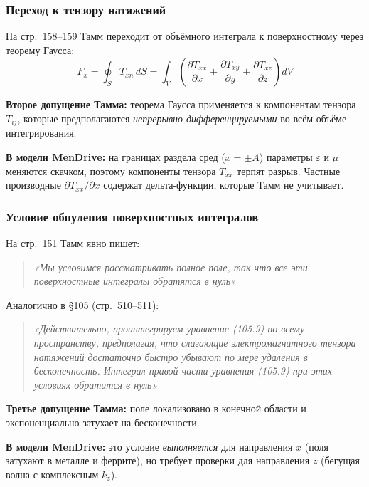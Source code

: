 \documentclass[a4paper,12pt]{article}
\begin{document}
\subsubsection{Переход к тензору натяжений}

На стр.~158--159 Тамм переходит от объёмного интеграла к поверхностному через теорему Гаусса:
\begin{equation}
F_x = \oint_S T_{xn}\,dS = \int_V \left(\frac{\partial T_{xx}}{\partial x} + \frac{\partial T_{xy}}{\partial y} + \frac{\partial T_{xz}}{\partial z}\right) dV
\label{eq:tamm_gauss}
\end{equation}

\textbf{Второе допущение Тамма:} теорема Гаусса применяется к компонентам тензора $T_{ij}$, которые предполагаются \textit{непрерывно дифференцируемыми} во всём объёме интегрирования.

\textbf{В модели MenDrive:} на границах раздела сред ($x = \pm A$) параметры $\varepsilon$ и $\mu$ меняются скачком, поэтому компоненты тензора $T_{xx}$ терпят разрыв. Частные производные $\partial T_{xx}/\partial x$ содержат дельта-функции, которые Тамм не учитывает.

\subsubsection{Условие обнуления поверхностных интегралов}

На стр.~151 Тамм явно пишет:
\begin{quote}
\textit{«Мы условимся рассматривать полное поле, так что все эти поверхностные интегралы обратятся в нуль»}
\end{quote}

Аналогично в \S 105 (стр.~510--511):
\begin{quote}
\textit{«Действительно, проинтегрируем уравнение (105.9) по всему пространству, предполагая, что слагающие электромагнитного тензора натяжений достаточно быстро убывают по мере удаления в бесконечность. Интеграл правой части уравнения (105.9) при этих условиях обратится в нуль»}
\end{quote}

\textbf{Третье допущение Тамма:} поле локализовано в конечной области и экспоненциально затухает на бесконечности.

\textbf{В модели MenDrive:} это условие \textit{выполняется} для направления $x$ (поля затухают в металле и феррите), но требует проверки для направления $z$ (бегущая волна с комплексным $k_z$).
\end{document}
